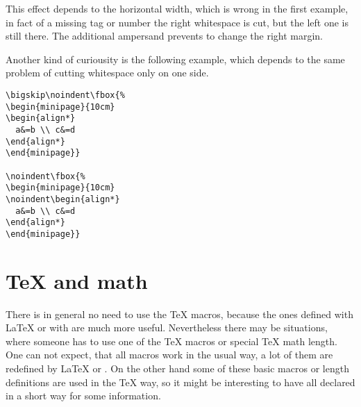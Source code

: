 \begin{table}[htb]
This effect depends to the horizontal width, which is wrong in the first example,
in fact of a missing tag or number the right whitespace is cut, but the left one
is still there. The additional ampersand prevents \AmSmath{} to change the right
margin. 

Another kind of curiousity is the following example, which depends to the
same problem of cutting whitespace only on one side.

\bigskip\noindent%

\noindent{} 

\bigskip
\begin{lstlisting}
\bigskip\noindent\fbox{%
\begin{minipage}{10cm}
\begin{align*}
  a&=b \\ c&=d
\end{align*}
\end{minipage}}

\noindent\fbox{%
\begin{minipage}{10cm}
\noindent\begin{align*}
  a&=b \\ c&=d
\end{align*}
\end{minipage}} 
\end{lstlisting}



\part{\TeX{} and math}

There is in general no need to use the \TeX{} macros, because the ones defined with \LaTeX{}
or with \AmSmath{} are much more useful. Nevertheless there may be situations, where someone    %
has to use one of the \TeX{} macros or special \TeX{} math length. One can not expect, that all
macros work in the usual way, a lot of them are redefined by \LaTeX{}    %
or \AmSmath{}. On the other hand some of these basic macros or length definitions are used
in the \TeX{} way, so it might be interesting to have all declared in a short way for some
information.


\end{table}
